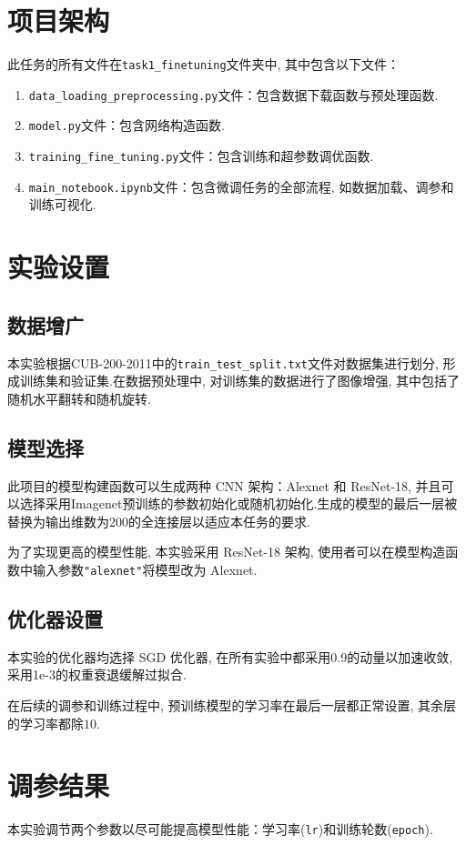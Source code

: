 \documentclass[notitlepage,cs4size,punct,oneside]{ctexrep}
\numberwithin{equation}{chapter}
\theoremstyle{mystyle}
\begin{document}
\section{项目架构}
此任务的所有文件在\texttt{task1\_finetuning}文件夹中, 其中包含以下文件：
\begin{enumerate}
\item \texttt{data\_loading\_preprocessing.py}文件：包含数据下载函数与预处理函数.
\item \texttt{model.py}文件：包含网络构造函数.
\item \texttt{training\_fine\_tuning.py}文件：包含训练和超参数调优函数.
\item \texttt{main\_notebook.ipynb}文件：包含微调任务的全部流程, 如数据加载、调参和训练可视化.
\end{enumerate}

\section{实验设置}
\subsection{数据增广}
本实验根据CUB-200-2011中的\texttt{train\_test\_split.txt}文件对数据集进行划分, 形成训练集和验证集.在数据预处理中, 对训练集的数据进行了图像增强, 其中包括了随机水平翻转和随机旋转.

\subsection{模型选择}
此项目的模型构建函数可以生成两种 CNN 架构：Alexnet 和 ResNet-18, 并且可以选择采用Imagenet预训练的参数初始化或随机初始化.生成的模型的最后一层被替换为输出维数为200的全连接层以适应本任务的要求.

为了实现更高的模型性能, 本实验采用 ResNet-18 架构, 使用者可以在模型构造函数中输入参数\texttt{"alexnet"}将模型改为 Alexnet.

\subsection{优化器设置}
本实验的优化器均选择 SGD 优化器, 在所有实验中都采用0.9的动量以加速收敛, 采用1e-3的权重衰退缓解过拟合.

在后续的调参和训练过程中, 预训练模型的学习率在最后一层都正常设置, 其余层的学习率都除$10$.


\section{调参结果}
本实验调节两个参数以尽可能提高模型性能：学习率(\texttt{lr})和训练轮数(\texttt{epoch}).
\end{document}
